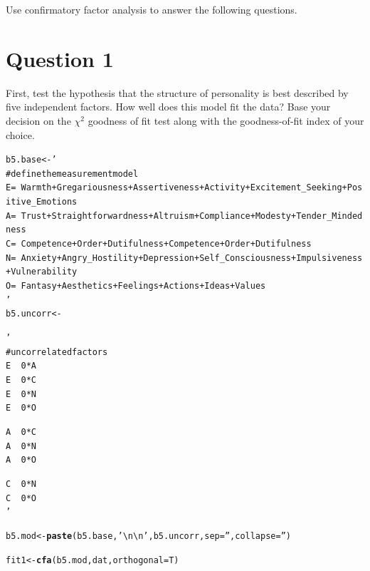 \documentclass{article}\usepackage[]{graphicx}\usepackage[]{color}
\makeatletter
\newcommand{\hlstr}[1]{\textcolor[rgb]{0.192,0.494,0.8}{#1}}%
\newcommand{\hlstd}[1]{\textcolor[rgb]{0.345,0.345,0.345}{#1}}%
\newcommand{\hlkwb}[1]{\textcolor[rgb]{0.69,0.353,0.396}{#1}}%
\newcommand{\hlkwc}[1]{\textcolor[rgb]{0.333,0.667,0.333}{#1}}%
\newcommand{\hlkwd}[1]{\textcolor[rgb]{0.737,0.353,0.396}{\textbf{#1}}}%
\newenvironment{kframe}{%
 \def\at@end@of@kframe{}%
 \ifinner\ifhmode%
  \def\at@end@of@kframe{\end{minipage}}%
  \begin{minipage}{\columnwidth}%
 \fi\fi%
 \def\FrameCommand##1{\hskip\@totalleftmargin \hskip-\fboxsep
 \colorbox{shadecolor}{##1}\hskip-\fboxsep
     \hskip-\linewidth \hskip-\@totalleftmargin \hskip\columnwidth}%
 \MakeFramed {\advance\hsize-\width
   \@totalleftmargin\z@ \linewidth\hsize
   \@setminipage}}%
 {\par\unskip\endMakeFramed%
 \at@end@of@kframe}
\newenvironment{knitrout}{}{} %
\makeatother
\begin{document}
Use confirmatory factor analysis to answer the following questions.  

\section{Question 1}
First, test the hypothesis that the structure of personality is best described by five independent factors. How well does this model fit the data? Base your decision on the $\chi^2$ goodness of fit test along with the goodness-of-fit index of your choice.  
\begin{knitrout}
\color{fgcolor}\begin{kframe}
\begin{alltt}
\hlstd{b5.base} \hlkwb{<-} \hlstr{'
# define the measurement model
E =~ Warmth + Gregariousness + Assertiveness + Activity + Excitement_Seeking + Positive_Emotions
A =~ Trust + Straightforwardness + Altruism + Compliance + Modesty + Tender_Mindedness
C =~ Competence + Order + Dutifulness + Competence + Order + Dutifulness
N =~ Anxiety + Angry_Hostility + Depression + Self_Consciousness + Impulsiveness + Vulnerability
O =~ Fantasy + Aesthetics + Feelings + Actions + Ideas + Values
'}
\hlstd{b5.uncorr} \hlkwb{<-}
\hlstr{'
# uncorrelated factors
E ~~ 0*A
E ~~ 0*C
E ~~ 0*N
E ~~ 0*O

A ~~ 0*C
A ~~ 0*N
A ~~ 0*O

C ~~ 0*N
C ~~ 0*O
'}

\hlstd{b5.mod} \hlkwb{<-} \hlkwd{paste}\hlstd{(b5.base,} \hlstr{'\textbackslash{}n\textbackslash{}n'}\hlstd{, b5.uncorr,} \hlkwc{sep} \hlstd{=} \hlstr{''}\hlstd{,} \hlkwc{collapse} \hlstd{=} \hlstr{''}\hlstd{)}

\hlstd{fit1} \hlkwb{<-} \hlkwd{cfa}\hlstd{(b5.mod, dat,} \hlkwc{orthogonal} \hlstd{= T)}


\end{alltt}
\end{kframe}
\end{knitrout}
\end{document}
